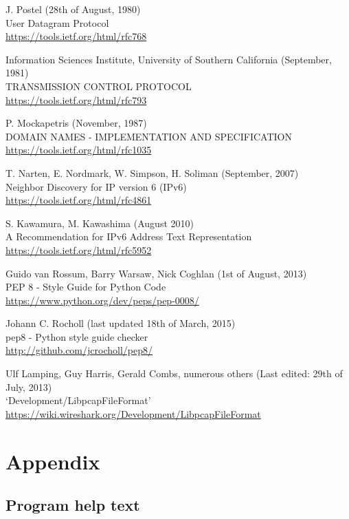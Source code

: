 \documentclass[10pt,a4paper,notitlepage]{report}
\begin{document}
\begin{thebibliography}{99}
	J. Postel (28th of August, 1980)\\
	User Datagram Protocol\\
	\url{https://tools.ietf.org/html/rfc768}

	Information Sciences Institute, University of Southern California (September, 1981)\\
	TRANSMISSION CONTROL PROTOCOL\\
	\url{https://tools.ietf.org/html/rfc793}

	P. Mockapetris (November, 1987)\\
	DOMAIN NAMES - IMPLEMENTATION AND SPECIFICATION\\
	\url{https://tools.ietf.org/html/rfc1035}

	T. Narten, E. Nordmark, W. Simpson, H. Soliman (September, 2007)\\
	Neighbor Discovery for IP version 6 (IPv6)\\
	\url{https://tools.ietf.org/html/rfc4861}

	S. Kawamura, M. Kawashima (August 2010)\\
	A Recommendation for IPv6 Address Text Representation\\
	\url{https://tools.ietf.org/html/rfc5952}

	Guido van Rossum, Barry Warsaw, Nick Coghlan (1st of August, 2013)\\
	PEP 8 - Style Guide for Python Code\\
	\url{https://www.python.org/dev/peps/pep-0008/}
	
	Johann C. Rocholl (last updated 18th of March, 2015)\\
	pep8 - Python style guide checker\\
	\url{http://github.com/jcrocholl/pep8/}

	Ulf Lamping, Guy Harris, Gerald Combs, numerous others (Last edited: 29th of July, 2013)\\
	`Development/LibpcapFileFormat'\\
	\url{https://wiki.wireshark.org/Development/LibpcapFileFormat}

\end{thebibliography}

\chapter{Appendix}
\section{Program help text}
\end{document}
